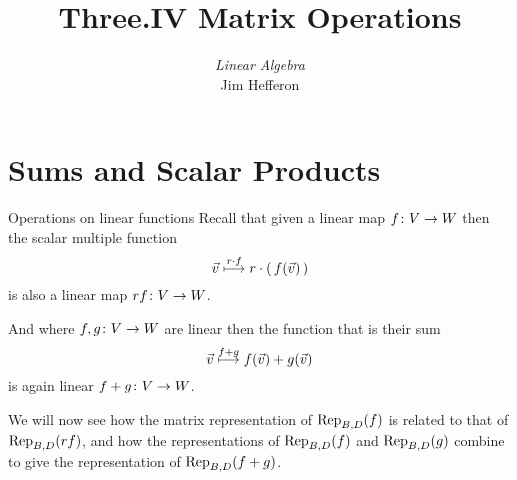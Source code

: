\usepackage{linalgjh}
\usepackage{present}
\usepackage{directories}  %
\usepackage{xr} %
\usepackage{xr} %
\usepackage{catchfilebetweentags}
\usepackage{etoolbox} %
\makeatletter
\patchcmd{\CatchFBT@Fin@l}{\endlinechar\m@ne}{}
  {}{}
\makeatother

{
}
\hypersetup{colorlinks=true,linkcolor=blue} 

\title[Matrix Operations] %
{Three.IV Matrix Operations}

\author{\textit{Linear Algebra} \\ {\small Jim Hef{}feron}}
\date{}


\subject{Matrix Operations}


\begin{frame}
  \titlepage
\end{frame}




\section{Sums and Scalar Products}
\begin{frame}{Operations on linear functions}
Recall that given 
a linear map $\map{f}{V}{W}$ then 
the scalar multiple function 
\begin{equation*}
  \vec{v}\mapsunder{r\cdot f} r\cdot (\,f(\vec{v})\,)
\end{equation*}
is also a linear map $\map{rf}{V}{W}$.

And where $\map{f,g}{V}{W}$ are 
linear then the function that is their sum 
\begin{equation*}
  \vec{v}\mapsunder{f+g} f(\vec{v})+g(\vec{v})
\end{equation*}
is again linear $\map{f+g}{V}{W}$.

We will now see how the matrix representation of
$\rep{f}{B,D}$ 
is related to that of $\rep{rf}{B,D}$, 
and how the representations of 
$\rep{f}{B,D}$ and $\rep{g}{B,D}$
combine to give the representation of $\rep{f+g}{B,D}$.
\end{frame}



